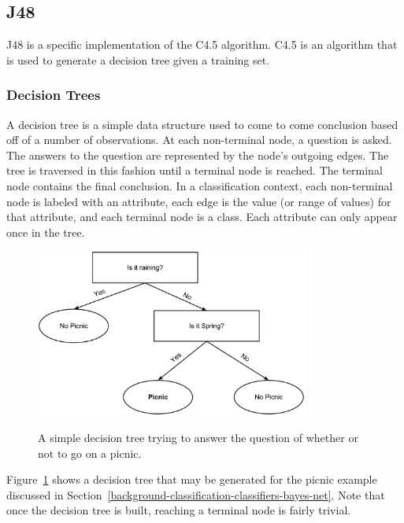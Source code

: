\documentclass[12pt]{ucthesis}
\newcommand{\captionfonts}{\small\bf\ssp}
\begin{document}
\subsection{J48}
\label{background-classification-classifiers-j48}
J48 is a specific implementation of the C4.5 algorithm.
C4.5 is an algorithm that is used to generate a decision tree given a training set.

\subsubsection{Decision Trees}
\label{background-classification-classifiers-j48-decision-trees}
A decision tree is a simple data structure used to come to come conclusion based off of a number of observations.
At each non-terminal node, a question is asked. The answers to the question are represented by the node's outgoing edges.
The tree is traversed in this fashion until a terminal node is reached. The terminal node contains the final conclusion.
In a classification context, each non-terminal node is labeled with an attribute, each edge is the value (or range of values)
for that attribute, and each terminal node is a class. Each attribute can only appear once in the tree.

\begin{figure}
   \begin{center}
      \includegraphics[width=0.8\textwidth]{images/Decision_Tree.eps}
      \captionfonts
      \caption[Simple Decision Tree]{A simple decision tree trying to answer the question of whether or not to go on a picnic.}
      \label{fig:decisionTree}
   \end{center}
\end{figure}

Figure~\ref{fig:decisionTree} shows a decision tree that may be generated for the picnic example discussed in Section~\ref{background-classification-classifiers-bayes-net}.
Note that once the decision tree is built, reaching a terminal node is fairly trivial.
\end{document}

